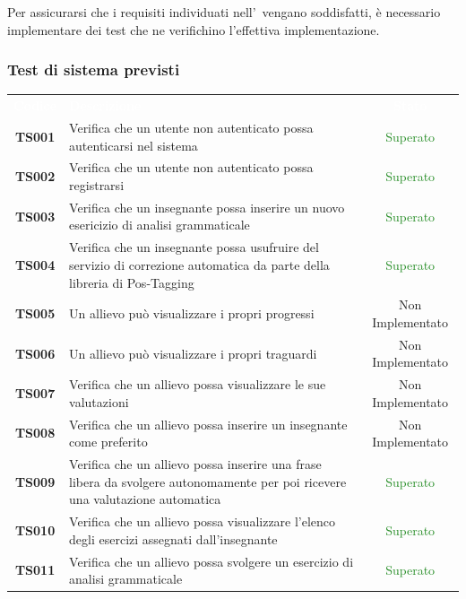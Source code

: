 Per assicurarsi che i requisiti individuati nell'\AdR \ vengano soddisfatti, è necessario implementare dei test che ne verifichino l'effettiva implementazione.

\subsubsection{Test di sistema previsti}

\begin{tabularx}{\textwidth}{cXc}
	
	\rowcolor{greySWEight}
	
	\rowcolor{greySWEight}
	\textcolor{white}{\textbf{Codice}} & 
	\textcolor{white}{\textbf{Descrizione}} &
	\textcolor{white}{\textbf{Stato}} \\
	
	\textbf{TS001} & Verifica che un utente non autenticato possa autenticarsi nel sistema & \textcolor{ForestGreen}{Superato} \\
	\textbf{TS002} & Verifica che un utente non autenticato possa registrarsi & \textcolor{ForestGreen}{Superato} \\
	\textbf{TS003} & Verifica che un insegnante possa inserire un nuovo esericizio di analisi grammaticale & \textcolor{ForestGreen}{Superato} \\
	\textbf{TS004} & Verifica che un insegnante possa usufruire del servizio di
	correzione automatica da parte della libreria di Pos-Tagging & \textcolor{ForestGreen}{Superato} \\
	\textbf{TS005} & Un allievo può visualizzare i propri progressi & Non Implementato \\
	\textbf{TS006} & Un allievo può visualizzare i propri traguardi & Non Implementato \\
	\textbf{TS007} & Verifica che un allievo possa visualizzare le sue valutazioni & Non Implementato \\
	\textbf{TS008} & Verifica che un allievo possa inserire un insegnante come preferito & Non Implementato \\
	\textbf{TS009} & Verifica che un allievo possa inserire una frase libera da svolgere autonomamente per poi ricevere
	una valutazione automatica & \textcolor{ForestGreen}{Superato} \\
	\textbf{TS010} & Verifica che un allievo possa visualizzare l’elenco degli
	esercizi assegnati dall’insegnante & \textcolor{ForestGreen}{Superato} \\
	\textbf{TS011} & Verifica che un allievo possa svolgere un esercizio di analisi grammaticale & \textcolor{ForestGreen}{Superato} \\

\end{tabularx}
